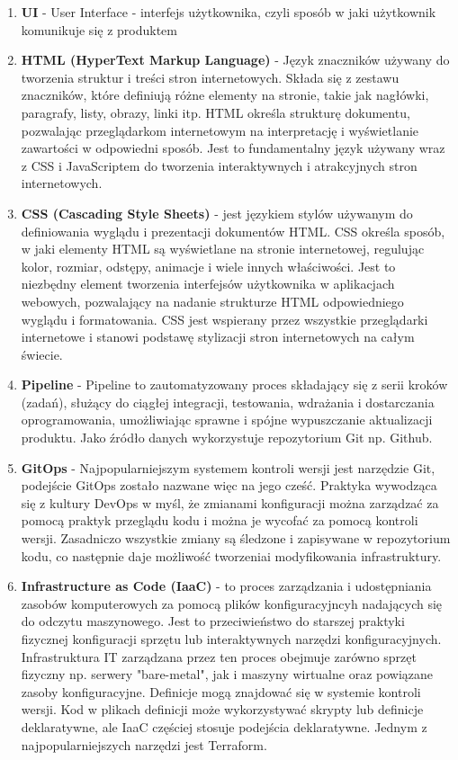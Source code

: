 \begin{enumerate}
    \item {\bf UI} - User Interface - interfejs użytkownika, czyli sposób w jaki użytkownik komunikuje się z produktem
   
    \item {\bf HTML (HyperText Markup Language)} - Język znaczników używany do tworzenia struktur i treści stron internetowych. Składa się z zestawu znaczników, które definiują różne elementy na stronie, takie jak nagłówki, paragrafy, listy, obrazy, linki itp. HTML określa strukturę dokumentu, pozwalając przeglądarkom internetowym na interpretację i wyświetlanie zawartości w odpowiedni sposób. Jest to fundamentalny język używany wraz z CSS i JavaScriptem do tworzenia interaktywnych i atrakcyjnych stron internetowych.
    
    \item {\bf CSS (Cascading Style Sheets)} - jest językiem stylów używanym do definiowania wyglądu i prezentacji dokumentów HTML. CSS określa sposób, w jaki elementy HTML są wyświetlane na stronie internetowej, regulując kolor, rozmiar, odstępy, animacje i wiele innych właściwości. Jest to niezbędny element tworzenia interfejsów użytkownika w aplikacjach webowych, pozwalający na nadanie strukturze HTML odpowiedniego wyglądu i formatowania. CSS jest wspierany przez wszystkie przeglądarki internetowe i stanowi podstawę stylizacji stron internetowych na całym świecie.

    \item {\bf Pipeline} - Pipeline to zautomatyzowany proces składający się z serii kroków (zadań), służący do ciągłej integracji, testowania, wdrażania i dostarczania oprogramowania, umożliwiając sprawne i spójne wypuszczanie aktualizacji produktu. Jako źródło danych wykorzystuje repozytorium Git np. Github.

    \item {\bf GitOps} - Najpopularniejszym systemem kontroli wersji jest narzędzie Git, podejście GitOps zostało nazwane więc na jego cześć. Praktyka wywodząca się z kultury DevOps w myśl, że zmianami konfiguracji można zarządzać za pomocą praktyk przeglądu kodu i można je wycofać za pomocą kontroli wersji. Zasadniczo wszystkie zmiany są śledzone i zapisywane w repozytorium kodu, co następnie daje możliwość tworzenia\linebreak i modyfikowania infrastruktury.

    \item {\bf Infrastructure as Code (IaaC)} - to proces zarządzania i udostępniania zasobów komputerowych za pomocą plików konfiguracyjncyh nadających się do odczytu maszynowego. Jest to przeciwieństwo do starszej praktyki fizycznej konfiguracji sprzętu lub interaktywnych narzędzi konfiguracyjnych. Infrastruktura IT zarządzana przez ten proces obejmuje zarówno sprzęt fizyczny np. serwery "bare-metal", jak i maszyny wirtualne oraz powiązane zasoby konfiguracyjne. Definicje mogą znajdować się w systemie kontroli wersji. Kod w plikach definicji może wykorzystywać skrypty lub definicje deklaratywne, ale IaaC częściej stosuje podejścia deklaratywne. Jednym z najpopularniejszych narzędzi jest Terraform.
     
 \end{enumerate}